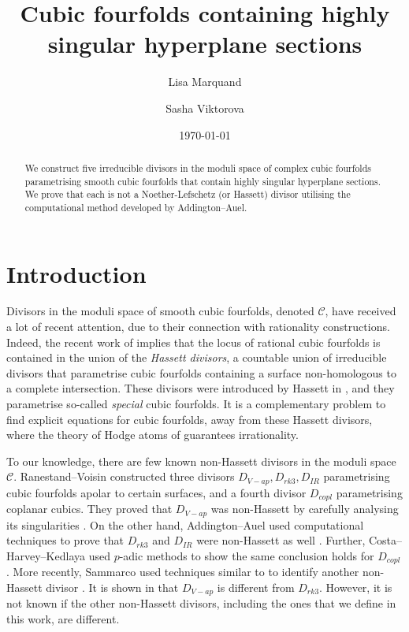 \documentclass[12pt]{amsart}
\author{Lisa Marquand}
\author{Sasha Viktorova}
\title[]{Cubic fourfolds containing highly singular hyperplane sections}
\date{\today}
\numberwithin{equation}{section}
\theoremstyle{plain}
\theoremstyle{remark}
\theoremstyle{definition}
\newcommand{\calC}{\mathcal{C}}
\begin{document}
\begin{abstract}
    We construct five irreducible divisors in the moduli space of complex cubic fourfolds parametrising smooth cubic fourfolds that contain highly singular hyperplane sections. We prove that each is not a Noether-Lefschetz (or Hassett) divisor utilising the computational method developed by Addington--Auel. 
\end{abstract}

\maketitle
\section{Introduction}
Divisors in the moduli space of smooth cubic fourfolds, denoted $\calC$, have received a lot of recent attention, due to their connection with rationality constructions. Indeed, the recent work of \cite{KKPY} implies that the locus of rational cubic fourfolds is contained in the union of the \textit{Hassett divisors}, a countable union of irreducible divisors that parametrise cubic fourfolds containing a surface non-homologous to a complete intersection. These divisors were introduced by Hassett in \cite{hassett}, and they parametrise so-called \textit{special} cubic fourfolds.
It is a complementary problem to find explicit equations for cubic fourfolds, away from these Hassett divisors, where the theory of Hodge atoms of \cite{KKPY} guarantees irrationality.

To our knowledge, there are few known non-Hassett divisors in the moduli space $\calC$. Ranestand--Voisin constructed three divisors $D_{V-ap},D_{rk3},D_{IR}$ parametrising cubic fourfolds apolar to certain surfaces, and a fourth divisor $D_{copl}$ parametrising coplanar cubics. They proved that $D_{V-ap}$ was non-Hassett by carefully analysing its singularities \cite{RV17}. On the other hand, Addington--Auel used computational techniques to prove that $D_{rk3}$ and $D_{IR}$ were non-Hassett as well \cite{AA}. Further, Costa--Harvey--Kedlaya used $p$-adic methods to show the same conclusion holds for $D_{copl}$ \cite{CHK}.  More recently, Sammarco used techniques similar to \cite{RV17} to identify another non-Hassett divisor \cite{sammarco25}. It is shown in \cite{RV17} that $D_{V-ap}$ is different from $D_{rk3}$. However, it is not known if the other non-Hassett divisors, including the ones that we define in this work, are different.
\end{document}
